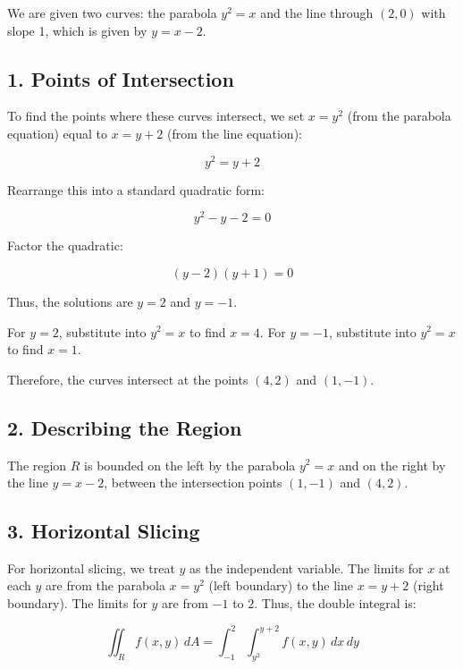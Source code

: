 \documentclass[11pt]{article}
\begin{document}
We are given two curves: the parabola \( y^2 = x \) and the line through \( (2, 0) \) with slope 1, which is given by \( y = x - 2 \).

\newpage

\subsection{1. Points of Intersection}

To find the points where these curves intersect, we set \( x = y^2 \) (from the parabola equation) equal to \( x = y + 2 \) (from the line equation):

\[
y^2 = y + 2
\]

Rearrange this into a standard quadratic form:

\[
y^2 - y - 2 = 0
\]

Factor the quadratic:

\[
(y - 2)(y + 1) = 0
\]

Thus, the solutions are \( y = 2 \) and \( y = -1 \).

For \( y = 2 \), substitute into \( y^2 = x \) to find \( x = 4 \). For \( y = -1 \), substitute into \( y^2 = x \) to find \( x = 1 \).

Therefore, the curves intersect at the points \( (4, 2) \) and \( (1, -1) \).

\newpage

\subsection{2. Describing the Region}

The region \( R \) is bounded on the left by the parabola \( y^2 = x \) and on the right by the line \( y = x - 2 \), between the intersection points \( (1, -1) \) and \( (4, 2) \).

\newpage

\subsection{3. Horizontal Slicing}

For horizontal slicing, we treat \( y \) as the independent variable. The limits for \( x \) at each \( y \) are from the parabola \( x = y^2 \) (left boundary) to the line \( x = y + 2 \) (right boundary). The limits for \( y \) are from \( -1 \) to \( 2 \). Thus, the double integral is:

\[
\iint_R f(x, y) \, dA = \int_{-1}^2 \int_{y^2}^{y+2} f(x, y) \, dx \, dy
\]
\end{document}
